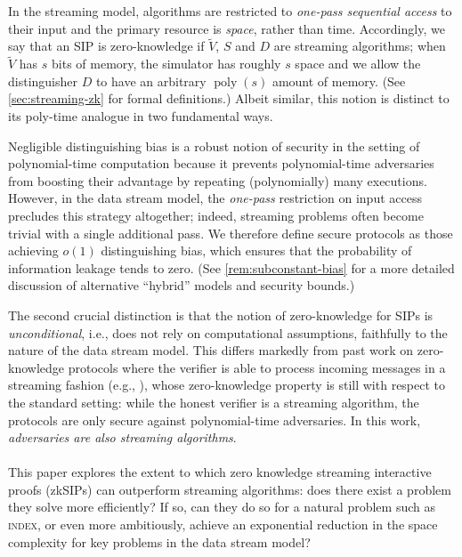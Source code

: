 \documentclass[10pt,a4paper]{article}
\newif\iflipics\lipicsfalse
\theoremstyle{definition}
\newcommand{\zksip}{\textrm{zkSIP}}
\newcommand{\poly}{\operatorname{poly}}
\newcommand{\indexproblem}{\normalfont\textsc{index}\xspace}
\begin{document}
In the streaming model, algorithms are restricted to \emph{one-pass sequential access} to their input and the primary resource is \emph{space}, rather than time. Accordingly, we say that an SIP is zero-knowledge if $\widetilde V$, $S$ and $D$ are streaming algorithms; when $\widetilde V$ has $s$ bits of memory, the simulator has roughly $s$ space and we allow the distinguisher $D$ to have an arbitrary $\poly(s)$ amount of memory. (See \cref{sec:streaming-zk} for formal definitions.) Albeit similar, this notion is distinct to its poly-time analogue in two fundamental ways.

Negligible distinguishing bias is a robust notion of security in the setting of polynomial-time computation because it prevents polynomial-time adversaries from boosting their advantage by repeating (polynomially) many executions. However, in the data stream model, the \emph{one-pass} restriction on input access precludes this strategy altogether; indeed, streaming problems often become trivial with a single additional pass. %
We therefore define secure protocols as those achieving $o(1)$ distinguishing bias, which ensures that the probability of information leakage tends to zero. (See \cref{rem:subconstant-bias} for a more detailed discussion of alternative ``hybrid'' models and security bounds.)

The second crucial distinction is that the notion of zero-knowledge for SIPs is \emph{unconditional}, i.e., does not rely on computational assumptions, faithfully to the nature of the data stream model. This differs markedly from past work on zero-knowledge protocols where the verifier is able to process incoming messages in a streaming fashion (e.g., \cite{GKR08,CMT12}), 
whose zero-knowledge property is still with respect to the standard setting: while the honest verifier is a streaming algorithm, the protocols are only secure against polynomial-time adversaries. In this work, \emph{adversaries are also streaming algorithms}.


\iflipics\else\paragraph*{}\fi This paper explores the extent to which zero knowledge streaming interactive proofs (\zksip{}s) can outperform streaming algorithms: does there exist a problem they solve more efficiently? If so, can they do so for a natural problem such as \indexproblem, or even more ambitiously, achieve an exponential reduction in the space complexity for key problems in the data stream model?
\end{document}
